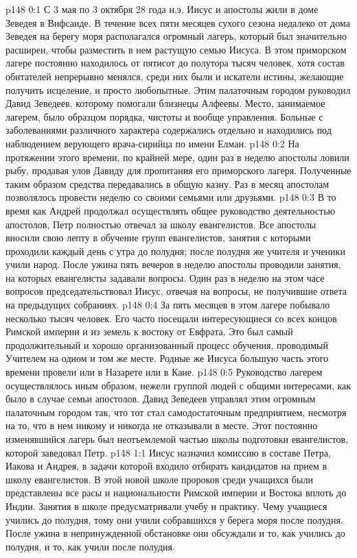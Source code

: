 \vs p148 0:1 С 3 мая по 3 октября 28 года н.э. Иисус и апостолы жили в доме Зеведея в Вифсаиде. В течение всех пяти месяцев сухого сезона недалеко от дома Зеведея на берегу моря располагался огромный лагерь, который был значительно расширен, чтобы разместить в нем растущую семью Иисуса. В этом приморском лагере постоянно находилось от пятисот до полутора тысяч человек, хотя состав обитателей непрерывно менялся, среди них были и искатели истины, желающие получить исцеление, и просто любопытные. Этим палаточным городом руководил Давид Зеведеев, которому помогали близнецы Алфеевы. Место, занимаемое лагерем, было образцом порядка, чистоты и вообще управления. Больные с заболеваниями различного характера содержались отдельно и находились под наблюдением верующего врача\hyp{}сирийца по имени Елман.
\vs p148 0:2 На протяжении этого времени, по крайней мере, один раз в неделю апостолы ловили рыбу, продавая улов Давиду для пропитания его приморского лагеря. Полученные таким образом средства передавались в общую казну. Раз в месяц апостолам позволялось провести неделю со своими семьями или друзьями.
\vs p148 0:3 В то время как Андрей продолжал осуществлять общее руководство деятельностью апостолов, Петр полностью отвечал за школу евангелистов. Все апостолы вносили свою лепту в обучение групп евангелистов, занятия с которыми проходили каждый день с утра до полудня; после полудня же учителя и ученики учили народ. После ужина пять вечеров в неделю апостолы проводили занятия, на которых евангелисты задавали вопросы. Один раз в неделю на этом часе вопросов председательствовал Иисус, отвечая на вопросы, не получившие ответа на предыдущих собраниях.
\vs p148 0:4 За пять месяцев в этом лагере побывало несколько тысяч человек. Его часто посещали интересующиеся со всех концов Римской империи и из земель к востоку от Евфрата. Это был самый продолжительный и хорошо организованный процесс обучения, проводимый Учителем на одном и том же месте. Родные же Иисуса большую часть этого времени провели или в Назарете или в Кане.
\vs p148 0:5 Руководство лагерем осуществлялось иным образом, нежели группой людей с общими интересами, как было в случае семьи апостолов. Давид Зеведеев управлял этим огромным палаточным городом так, что тот стал самодостаточным предприятием, несмотря на то, что в нем никому и никогда не отказывали в месте. Этот постоянно изменявшийся лагерь был неотъемлемой частью школы подготовки евангелистов, которой заведовал Петр.
\vs p148 1:1 Иисус назначил комиссию в составе Петра, Иакова и Андрея, в задачи которой входило отбирать кандидатов на прием в школу евангелистов. В этой новой школе пророков среди учащихся были представлены все расы и национальности Римской империи и Востока вплоть до Индии. Занятия в школе предусматривали учебу и практику. Чему учащиеся учились до полудня, тому они учили собравшихся у берега моря после полудня. После ужина в непринужденной обстановке они обсуждали и то, как учились до полудня, и то, как учили после полудня.
